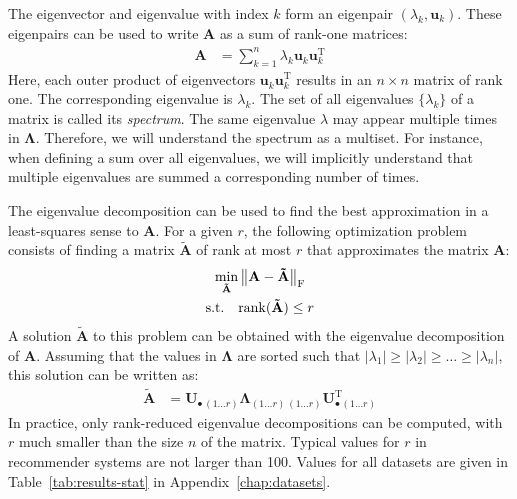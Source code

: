 \documentclass[11pt,a4paper]{book}
\newcommand{\syRank}{r}
\begin{document}
The eigenvector and eigenvalue with index $k$ form an
eigenpair $(\lambda_k, \mathbf u_k)$.  These eigenpairs can be used to
write $\mathbf A$ as a sum of rank-one matrices: 
\begin{align}
  \mathbf A &= \sum_{k=1}^n \lambda_k^{\phantom{\mathrm I}} \mathbf
  u_k^{\phantom{\mathrm I}} \mathbf u_k^{\mathrm T}  
\end{align}
Here, each outer product of eigenvectors $\mathbf u_k^{\phantom{\mathrm
    I}} \mathbf u_k^{\mathrm T}$ results in an $n
\times n$ matrix of rank one.  The corresponding eigenvalue is
$\lambda_k$. 
The set of all eigenvalues $\{\lambda_k\}$ of a matrix is called its
\emph{spectrum}.  The same eigenvalue $\lambda$ may appear multiple
times in $\mathbf \Lambda$.  Therefore, we will understand
the spectrum 
as a multiset.  For instance, when defining a sum over all eigenvalues,
we will implicitly understand that multiple eigenvalues are summed a
corresponding number of times. 

The eigenvalue decomposition can be used to find the best approximation
in a least-squares sense
to $\mathbf A$.
For a given $\syRank$, the following optimization problem consists of finding
a matrix $\mathbf{\tilde A}$ of rank at most $\syRank$ that approximates the
matrix $\mathbf A$: 
\begin{align}
  \min_{\mathbf{\tilde A}} & \left\| \mathbf A -
    \mathbf{\tilde A} \right\|_{\mathrm F} \\
    \textnormal{s.t.} \quad & \mathrm{rank}(\mathbf{\tilde A}) \leq \syRank
\end{align}
A solution $\mathbf{\tilde A}$ to this problem can be obtained with the eigenvalue
decomposition of $\mathbf A$. 
Assuming that the values in $\mathbf
\Lambda$ are sorted such that $|\lambda_1| \geq |\lambda_2| \geq \ldots
\geq |\lambda_n|$, this solution can be written as:
\begin{align}
  \mathbf{\tilde A} &= \mathbf U_{\bullet \, (1\ldots
    \syRank)}^{\phantom {\mathrm T}} \mathbf \Lambda_{(1\ldots
    \syRank)\,(1\ldots \syRank)}^{\phantom {\mathrm T}} \mathbf U_{\bullet \, (1\ldots
    \syRank)}^{\mathrm T} 
\end{align}
In practice, only rank-reduced eigenvalue decompositions can be
computed, with $\syRank$ much
smaller than the size $n$ of the matrix.  Typical values for $\syRank$ in
recommender systems are not larger than 100. 
Values for all datasets are given in Table~\ref{tab:results-stat} in
Appendix~\ref{chap:datasets}. 
\end{document}
